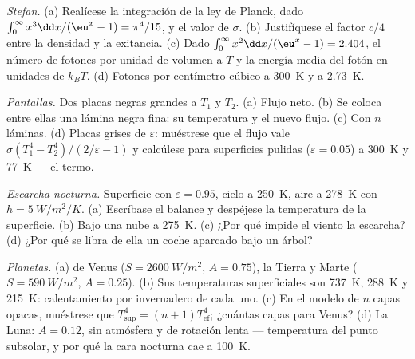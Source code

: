 \begin{exercise}[$\star\star$]\label{exo:b2:thermal-radiation:7}
\emph{Stefan.} (a) Realícese la integración de la ley de Planck, dado
$\int_0^\infty x^3\dd x/(\eu^x - 1) = \pi^4/15$, y el valor de $\sigma$.
(b) Justifíquese el factor $c/4$ entre la densidad y la exitancia. (c)
Dado $\int_0^\infty x^2\dd x/(\eu^x - 1) = 2.404$, el número de fotones
por unidad de volumen a $T$ y la energía media del fotón en unidades de $k_BT$.
(d) Fotones por centímetro cúbico a \qty{300}{K} y a \qty{2.73}{K}.
\end{exercise}

\begin{exercise}[$\star\star$]\label{exo:b2:thermal-radiation:8}
\emph{Pantallas.} Dos placas negras grandes a $T_1$ y $T_2$. (a) Flujo neto.
(b) Se coloca entre ellas una lámina negra fina: su temperatura y el
nuevo flujo. (c) Con $n$ láminas. (d) Placas grises de  $\varepsilon$:
muéstrese que el flujo vale $\sigma(T_1^4 - T_2^4)/(2/\varepsilon - 1)$ y calcúlese
para superficies pulidas ($\varepsilon = 0.05$) a \qty{300}{K} y
\qty{77}{K} --- el termo.
\end{exercise}

\begin{exercise}[$\star\star$]\label{exo:b2:thermal-radiation:9}
\emph{Escarcha nocturna.} Superficie con $\varepsilon = 0.95$, cielo a \qty{250}{K}, aire a
\qty{278}{K} con $h = \qty{5}{W/m^2/K}$. (a) Escríbase el balance y despéjese
la temperatura de la superficie. (b) Bajo una nube a \qty{275}{K}. (c) ¿Por qué
impide el viento la escarcha? (d) ¿Por qué se libra de ella un coche aparcado bajo un árbol?
\end{exercise}

\begin{exercise}[$\star\star\star$]\label{exo:b2:thermal-radiation:10}
\emph{Planetas.} (a)  de Venus ($S = \qty{2600}{W/m^2}$,
$A = 0.75$), la Tierra y Marte ($S = \qty{590}{W/m^2}$, $A = 0.25$). (b) Sus
temperaturas superficiales son \qty{737}{K}, \qty{288}{K} y \qty{215}{K}:
calentamiento por invernadero de cada uno. (c) En el modelo de $n$ capas opacas,
muéstrese que $T_{\text{sup}}^4 = (n + 1)T_{\text{ef}}^4$; ¿cuántas capas para Venus?
(d) La Luna: $A = 0.12$, sin atmósfera y de rotación lenta --- temperatura
del punto subsolar, y por qué la cara nocturna cae a \qty{100}{K}.
\end{exercise}


